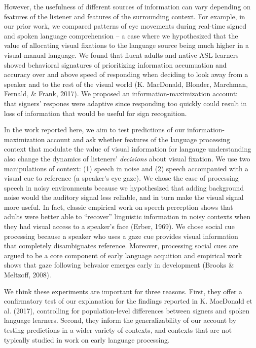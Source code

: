 \documentclass[10pt, letterpaper]{article}
\begin{document}
However, the usefulness of different sources of information can vary
depending on features of the listener and features of the surrounding
context. For example, in our prior work, we compared patterns of eye
movements during real-time signed and spoken language comprehension -- a
case where we hypothesized that the value of allocating visual fixations
to the language source being much higher in a visual-manual language. We
found that fluent adults and native ASL learners showed behavioral
signatures of prioritizing information accumuation and accuracy over and
above speed of responding when deciding to look away from a speaker and
to the rest of the visual world (K. MacDonald, Blonder, Marchman,
Fernald, \& Frank, 2017). We proposed an information-maximization
account: that signers' respones were adaptive since responding too
quickly could result in loss of information that would be useful for
sign recognition.

In the work reported here, we aim to test predictions of our
information-maximization account and ask whether features of the
language processing context that modulate the value of visual
information for langauge understanding also change the dynamics of
listeners' \emph{decisions} about visual fixation. We use two
manipulations of context: (1) speech in noise and (2) speech accompanied
with a visual cue to reference (a speaker's eye gaze). We chose the case
of processing speech in noisy environments because we hypothesized that
adding background noise would the auditory signal less reliable, and in
turn make the visual signal more useful. In fact, classic empirical work
on speech perception shows that adults were better able to ``recover''
linguistic information in noisy contexts when they had visual access to
a speaker's face (Erber, 1969). We chose social cue processing because a
speaker who uses a gaze cue provides visual information that completely
disambiguates reference. Moreover, processing social cues are argued to
be a core component of early language acquition and empirical work shows
that gaze following behvaior emerges early in development (Brooks \&
Meltzoff, 2008).

We think these experiments are important for three reasons. First, they
offer a confirmatory test of our explanation for the findings reported
in K. MacDonald et al. (2017), controlling for population-level
differences between signers and spoken language learners. Second, they
inform the generalizability of our account by testing predictions in a
wider variety of contexts, and contexts that are not typically studied
in work on early language processing.
\end{document}
